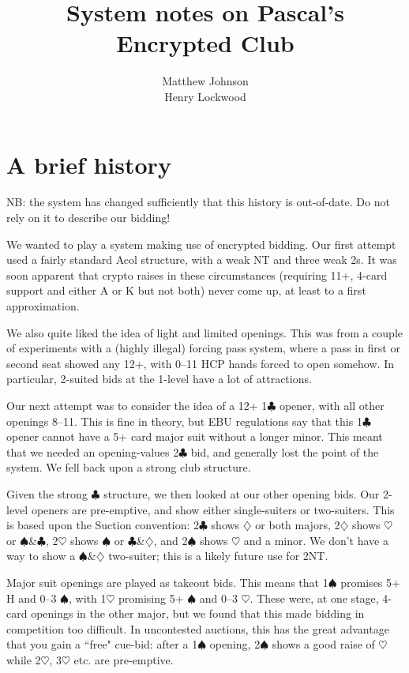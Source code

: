 \documentclass[a4paper,12pt]{article}
\author{Matthew Johnson\\Henry Lockwood}
\title{System notes on Pascal's Encrypted Club}
\begin{document}
\maketitle

\section{A brief history}

NB: the system has changed sufficiently that this history is out-of-date.  Do
not rely on it to describe our bidding!

We wanted to play a system making use of encrypted bidding.  Our first attempt
used a fairly standard Acol structure, with a weak NT and three weak 2s.  It
was soon apparent that crypto raises in these circumstances (requiring 11+,
4-card support and either A or K but not both) never come up, at least to a
first approximation.

We also quite liked the idea of light and limited openings.  This was from a
couple of experiments with a (highly illegal) forcing pass system, where a pass
in first or second seat showed any 12+, with 0--11 HCP hands forced to open
somehow.  In particular, 2-suited bids at the 1-level have a lot of
attractions.

Our next attempt was to consider the idea of a 12+ 1$\clubsuit$ opener, with all other
openings 8--11.  This is fine in theory, but EBU regulations say that this 1$\clubsuit$
opener cannot have a 5+ card major suit without a longer minor.  This meant
that we needed an opening-values 2$\clubsuit$ bid, and generally lost the point of the
system.  We fell back upon a strong club structure.

Given the strong $\clubsuit$ structure, we then looked at our other opening bids.  Our
2-level openers are pre-emptive, and show either single-suiters or two-suiters.
This is based upon the Suction convention: 2$\clubsuit$ shows $\diamondsuit$ or both majors, 2$\diamondsuit$ shows
$\heartsuit$ or $\spadesuit$\&$\clubsuit$, 2$\heartsuit$ shows $\spadesuit$ or $\clubsuit$\&$\diamondsuit$, and 2$\spadesuit$ shows $\heartsuit$ and a minor.  We don't have a way
to show a $\spadesuit$\&$\diamondsuit$ two-suiter; this is a likely future use for 2NT.

Major suit openings are played as takeout bids.  This means that 1$\spadesuit$ promises 5+
H and 0--3 $\spadesuit$, with 1$\heartsuit$ promising 5+ $\spadesuit$ and 0--3 $\heartsuit$.  These were, at one stage,
4-card openings in the other major, but we found that this made bidding in
competition too difficult.  In uncontested auctions, this has the great
advantage that you gain a ``free" cue-bid: after a 1$\spadesuit$ opening, 2$\spadesuit$ shows a good
raise of $\heartsuit$ while 2$\heartsuit$, 3$\heartsuit$ etc. are pre-emptive.
\end{document}
